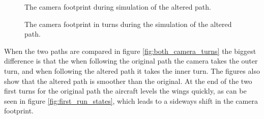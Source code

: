 \begin{figure}[]
    \centering
    \caption{The camera footprint during simulation of the altered path.}
	\label{fig:second_camera_path}
\end{figure}

\begin{figure}[]
    \centering
    \caption{The camera footprint in turns during the simulation of the altered path.}
	\label{fig:second_camera_turns}
\end{figure}

When the two paths are compared in figure \ref{fig:both_camera_turns} the biggest difference is that the when following the original path the camera takes the outer turn, and when following the altered path it takes the inner turn. The figures also show that the altered path is smoother than the original. At the end of the two first turns for the original path the aircraft levels the wings quickly, as can be seen in figure \ref{fig:first_run_states}, which leads to a sideways shift in the camera footprint.

